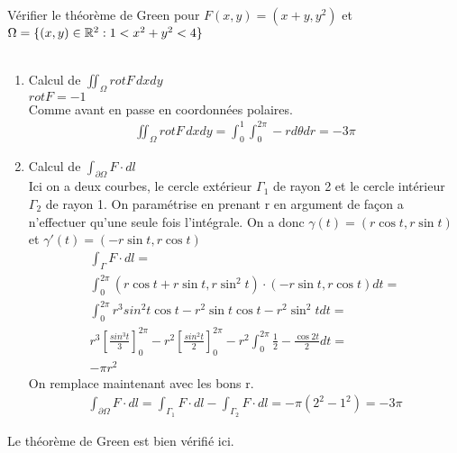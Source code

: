 \begin{myExample}
	Vérifier le théorème de Green pour $F(x,y)=(x+y,y^2)$ et $\Omega=\{(x,y)\in\mathbb{R}^2:1<x^2+y^2<4\}$
	\\\\
	\begin{enumerate}
		\item Calcul de $\iint_\Omega rot F \,dxdy$
		\\
		$rot F = -1$
		\\Comme avant en passe en coordonnées polaires.
		\begin{eqnarray*}
			\iint_\Omega rot F \,dxdy=
			\int_0^1\int_{0}^{2\pi}-r d\theta dr=
			-3\pi
		\end{eqnarray*}
		\item Calcul de $\int_{\partial\Omega}F\cdot dl$
		\\Ici on a deux courbes, le cercle extérieur $\Gamma_1$ de rayon 2 et le cercle intérieur $\Gamma_2$ de rayon 1. On paramétrise en prenant r en argument de façon a n'effectuer qu'une seule fois l'intégrale. On a donc $\gamma(t)=(r\cos t, r\sin t)$ et $\gamma'(t)=(-r\sin t, r\cos t)$
		\begin{eqnarray*}
			\int_{\Gamma}F\cdot dl=\\
			\int_{0}^{2\pi} (r\cos t + r\sin t, r\sin^2t)\cdot(-r\sin t, r\cos t)dt=\\
			\int_0^{2\pi} r^3sin^2t\cos t-r^2\sin t\cos t-r^2\sin^2tdt=\\
			r^3\left[\frac{sin^3t}{3}\right]_{0}^{2\pi}-r^2\left[\frac{sin^2t}{2}\right]_{0}^{2\pi}-r^2\int_{0}^{2\pi}\frac{1}{2}-\frac{\cos 2t}{2}dt=\\
			-\pi r^2
		\end{eqnarray*}
		On remplace maintenant avec les bons r.
		\begin{eqnarray*}
		\int_{\partial\Omega}F\cdot dl=\int_{\Gamma_1}F\cdot dl-\int_{\Gamma_2}F\cdot dl=-\pi(2^2-1^2)=-3\pi
		\end{eqnarray*}
	\end{enumerate}
	Le théorème de Green est bien vérifié ici.
\end{myExample}

